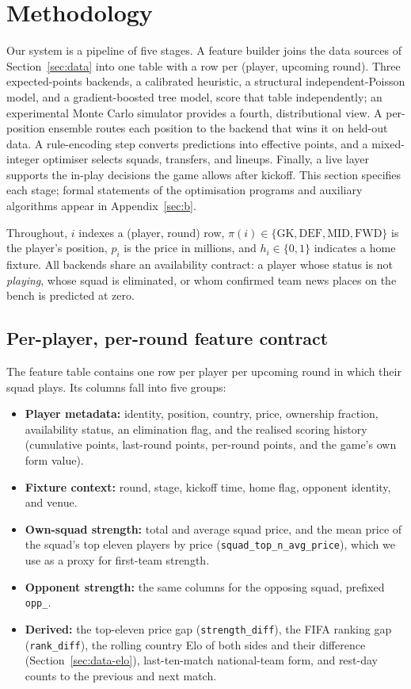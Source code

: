 \section{Methodology}
\label{sec:methodology}

Our system is a pipeline of five stages. A feature builder joins the
data sources of Section~\ref{sec:data} into one table with a row per
(player, upcoming round). Three expected-points backends, a calibrated
heuristic, a structural independent-Poisson model, and a
gradient-boosted tree model, score that table independently; an
experimental Monte Carlo simulator provides a fourth, distributional
view. A per-position ensemble routes each position to the backend that
wins it on held-out data. A rule-encoding step converts predictions
into effective points, and a mixed-integer optimiser selects squads,
transfers, and lineups. Finally, a live layer supports the in-play
decisions the game allows after kickoff. This section specifies each
stage; formal statements of the optimisation programs and auxiliary
algorithms appear in Appendix~\ref{sec:b}.

Throughout, $i$ indexes a (player, round) row, $\pi(i) \in
\{\mathrm{GK}, \mathrm{DEF}, \mathrm{MID}, \mathrm{FWD}\}$ is the
player's position, $p_i$ is the price in millions, and $h_i \in \{0,
1\}$ indicates a home fixture. All backends share an availability
contract: a player whose status is not \emph{playing}, whose squad is
eliminated, or whom confirmed team news places on the bench is
predicted at zero.

\subsection{Per-player, per-round feature contract}
\label{sec:methodology-features}

The feature table contains one row per player per upcoming round in
which their squad plays. Its columns fall into five groups:

\begin{itemize}
\item \textbf{Player metadata:} identity, position, country, price,
  ownership fraction, availability status, an elimination flag, and
  the realised scoring history (cumulative points, last-round points,
  per-round points, and the game's own form value).
\item \textbf{Fixture context:} round, stage, kickoff time, home flag,
  opponent identity, and venue.
\item \textbf{Own-squad strength:} total and average squad price, and
  the mean price of the squad's top eleven players by price
  (\texttt{squad\_top\_n\_avg\_price}), which we use as a proxy for
  first-team strength.
\item \textbf{Opponent strength:} the same columns for the opposing
  squad, prefixed \texttt{opp\_}.
\item \textbf{Derived:} the top-eleven price gap
  (\texttt{strength\_diff}), the FIFA ranking gap
  (\texttt{rank\_diff}), the rolling country Elo of both sides and
  their difference (Section~\ref{sec:data-elo}), last-ten-match
  national-team form, and rest-day counts to the previous and next
  match.
\end{itemize}

